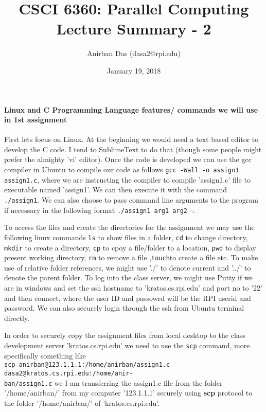 \documentclass[a4paper,12 pt]{article}
\title{\vspace{-2.0cm}CSCI 6360: Parallel Computing Lecture Summary - 2}
\author{Anirban Das (dasa2@rpi.edu) }
\date{January 19, 2018}
\begin{document}
\maketitle

\paragraph{Linux and C Programming Language features/ commands we will use in 1st assignment\\}
First lets focus on Linux. At the beginning we would need a text based editor to develop the C code. I tend to SublimeText to do that (though some people might prefer the almighty 'vi' editor). Once the code is developed we can use the gcc compiler in Ubuntu to compile our code as follows \texttt{gcc -Wall -o assign1 assign1.c}, where we are instructing the compiler to compile 'assign1.c' file to executable named 'assign1'. We can then execute it with the command \texttt{./assign1}. We can also choose to pass command line arguments to the program if necessary in the following format \texttt{./assign1 arg1 arg2}$\cdots$.

To access the files and create the directories for the assignment we may use the following linux commands \texttt{ls} to show files in a folder, \texttt{cd} to change directory, \texttt{mkdir} to create a directory, \texttt{cp} to cpoy a file/folder to a location, \texttt{pwd} to display present working directory, \texttt{rm} to remove a file ,\texttt{touch}to create a file etc. To make use of relative folder references, we might use './' to denote current and '../' to denote the parent folder. To log into the class server, we might use Putty if we are in windows and set the ssh hostname to 'kratos.cs.rpi.edu' and port no to '22' and then connect, where the user ID and passowrd will be the RPI userid and password. We can also securely login through the ssh from Ubuntu terminal directly. 

In order to securely copy the assignment files from local desktop to the class development server 'kratos.cs.rpi.edu' we need to use the \texttt{scp} command, more specifically something like\\
 \texttt{scp anirban@123.1.1.1:/home/anirban/assign1.c dasa2@kratos.cs.rpi.edu:/home/anir-}\\ \texttt{ban/assign1.c} we I am transferring the assign1.c file from the folder '/home/anirban/' from my computer '123.1.1.1' securely using \textbf{scp} protocol to the folder '/home/anirban/' of 'kratos.cs.rpi.edu'.
 
\end{document}
